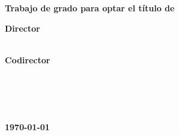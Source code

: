 \begin{titlepage}
    \begin{center}

        \textbf{\tit}

        \vspace{6em}

        \nam

        \vspace{6em}

        \textbf{Trabajo de grado para optar el título de \opta}

        \vspace{6em}

        \textbf{Director}\\
        \tdir\ \dir\\  \edir

        \vspace{3em}
        
        \textbf{Codirector}\\
        \tcdir\ \cdir\\ \ecdir

        \vspace{6em}
        
        \textbf{\uni} \\
        \textbf{\fac} \\
        \textbf{\esc} \\
        \textbf{\today}

    
   \end{center}
\end{titlepage}

